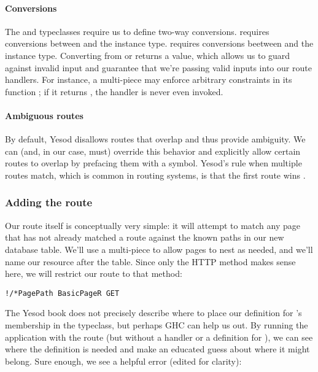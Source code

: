 \paragraph{Conversions} The  and  typeclasses require us to define two-way conversions.  requires conversions between  and the instance type.  requires conversions beetween \code{[Text]} and the instance type. Converting from  or \code{[Text]} returns a  value, which allows us to guard against invalid input and guarantee that we're passing valid inputs into our route handlers. For instance, a multi-piece may enforce arbitrary constraints in its function ; if it returns , the handler is never even invoked.

\paragraph{Ambiguous routes} By default, Yesod disallows routes that overlap and thus provide ambiguity. We can (and, in our case, must) override this behavior and explicitly allow certain routes to overlap by prefacing them with a \code{!} symbol. Yesod's rule when multiple routes match, which is common in routing systems, is that the first route wins \cite{ybkRouting}.

\subsubsection{Adding the route}

Our route itself is conceptually very simple: it will attempt to match any page that has not already matched a route against the known paths in our new database table. We'll use a multi-piece to allow pages to nest as needed, and we'll name our resource after the  table. Since only the  HTTP method makes sense here, we will restrict our route to that method:

\begin{Verbatim}
!/*PagePath BasicPageR GET
\end{Verbatim}

The Yesod book does not precisely describe where to place our definition for 's membership in the  typeclass, but perhaps GHC can help us out. By running the application with the route (but without a handler or a definition for ), we can see where the definition is needed and make an educated guess about where it might belong. Sure enough, we see a helpful error (edited for clarity):

